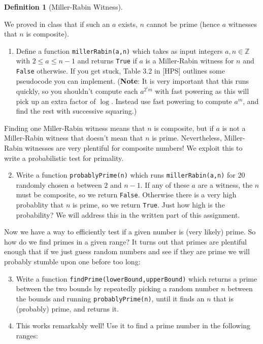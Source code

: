 \documentclass[11pt]{article}
\newtheorem{definition}{Definition}
\newcommand{\bZ}{\mathbb{Z}}
\begin{document}
\begin{enumerate}
{\begin{definition}[Miller-Rabin Witness]
\begin{itemize}
    \end{itemize}
  \end{definition}
  We proved in class that if such an $a$ exists, $n$ cannot be prime (hence $a$ witnesses that $n$ is composite).
  \begin{enumerate}
    \item{
    Define a function \verb|millerRabin(a,n)| which takes as input integers $a,n\in\bZ$ with $2\le a\le n-1$ and returns \verb|True| if $a$ is a Miller-Rabin witness for $n$ and \verb|False| otherwise.  If you get stuck, Table 3.2 in [HPS] outlines some pseudocode you can implement.   (\textbf{Note}: It is very important that this runs quickly, so you shouldn't compute each $a^{2^im}$ with fast powering as this will pick up an extra factor of $\log$.  Instead use fast powering to compute $a^m$, and find the rest with successive squaring.)
    }
  \end{enumerate}
  Finding one Miller-Rabin witness means that $n$ is composite, but if $a$ is not a Miller-Rabin witness that doesn't mean that $n$ is prime.  Nevertheless, Miller-Rabin witnesses are very plentiful for composite numbers!  We exploit this to write a probabilistic test for primality.
  \begin{enumerate}
    \setcounter{enumii}{1}
    \item{
    Write a function \verb|probablyPrime(n)| which runs \verb|millerRabin(a,n)| for 20 randomly chosen $a$ between $2$ and $n-1$.  If any of these $a$ are a witness, the $n$ must be composite, so we return \verb|False|.  Otherwise there is a very high probablity that $n$ is prime, so we return \verb|True|.  Just how high is the probability?  We will address this in the written part of this assignment.
    }
  \end{enumerate}
  Now we have a way to efficiently test if a given number is (very likely) prime.  So how do we find primes in a given range?  It turns out that primes are plentiful enough that if we just guess random numbers and see if they are prime we will probably stumble upon one before too long:
  \begin{enumerate}
    \setcounter{enumii}{2}
    \item{
    Write a function \verb|findPrime(lowerBound,upperBound)| which returns a prime between the two bounds by repeatedly picking a random number $n$ between the bounds and running \verb|probablyPrime(n)|, until it finds an $n$ that is (probably) prime, and returns it.
    }
    \item{
    This works remarkably well!  Use it to find a prime number in the following ranges:
}
\end{enumerate}}
\end{enumerate}
\end{document}
